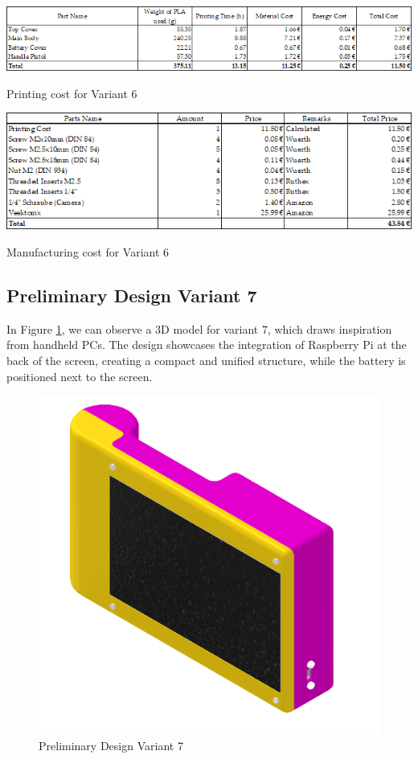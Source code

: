 \begin{table}[H]
    \centering
    \includegraphics[width=\linewidth]{texs/Part1/chapter3/image/v6printed.png}
    \caption{Printing cost for Variant 6}
    \label{tab:printing_cost_variant_6}
\end{table}

\begin{table}[H]
    \centering
    \includegraphics[width=\linewidth]{texs/Part1/chapter3/image/v6manu.png}
    \caption{Manufacturing cost for Variant 6}
    \label{tab:manufacturing_cost_variant_6}
\end{table}

\subsection{Preliminary Design Variant 7}
In Figure \ref{fig:preliminary_design_variant_7}, we can observe a 3D model for variant 7, which draws inspiration from handheld PCs. The design showcases the integration of Raspberry Pi at the back of the screen, creating a compact and unified structure, while the battery is positioned next to the screen.

\begin{figure}[!ht]
    \centering
    \includegraphics[height=5 cm]{texs/Part1/chapter4/image/v71.png}
    \caption{Preliminary Design Variant 7}
    \label{fig:preliminary_design_variant_7}
\end{figure}

